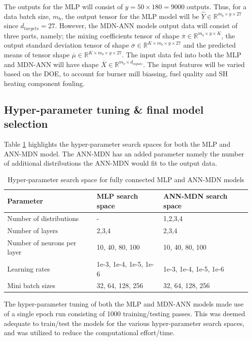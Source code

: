 \documentclass[a4paper,fleqn]{cas-dc}
\begin{document}
The outputs for the MLP will consist of $y=50\times180=9000$ outputs. Thus, for a data batch size, $m_b$, the output tensor for the MLP model will be $\hat{Y}\in \mathbb{R}^{m_b\times y\times 27}$ since $d_{targets}=27$. However, the MDN-ANN models output data will consist of three parts, namely; the mixing coefficients tensor of shape  $\overline{\pi}\in \mathbb{R}^{m_b \times y\times K}$, the output standard deviation tensor of shape $\overline{\sigma}\in \mathbb{R}^{K\times m_b\times y\times 27}$ and the predicted means of tensor shape $\overline{\mu}\in \mathbb{R}^{K\times m_b\times y\times 27}$. The input data fed into both the MLP and MDN-ANN will have shape $\overline{X}\in \mathbb{R}^{m_b\times d_{inputs}}$. The input features will be varied based on the DOE, to account for burner mill biassing, fuel quality and SH heating component fouling.\\
\subsection{Hyper-parameter tuning \& final model selection}\label{sec_hyper}
Table \ref{tbl_tuning} highlights the hyper-parameter search spaces for both the MLP and ANN-MDN model. The ANN-MDN has an added parameter namely the number of additional distributions the ANN-MDN would fit to the output data. \\

\begin{table}[h!]
\caption{Hyper-parameter search space for fully connected MLP and ANN-MDN models}\label{tbl_tuning}
\begin{tabular*}{\tblwidth}{p{}p{}p{}}
\toprule
 Parameter& MLP search space & ANN-MDN search space \\ %
\midrule
 Number of distributions & - & 1,2,3,4  \\
 Number of layers & 2,3,4 & 2,3,4\\
 Number of neurons per layer & 10, 40, 80, 100  & 10, 40, 80, 100\\
 Learning rates & 1e-3, 1e-4, 1e-5, 1e-6 &  1e-3, 1e-4, 1e-5, 1e-6   \\
 Mini batch sizes  &32, 64, 128, 256 &32, 64, 128, 256  \\
\bottomrule
\end{tabular*}
\end{table}

The hyper-parameter tuning of both the MLP and MDN-ANN models made use of a single epoch run consisting of 1000 training/testing passes. This was deemed adequate to train/test the models for the various hyper-parameter search spaces, and was utilized to reduce the computational effort/time.\\
\end{document}
